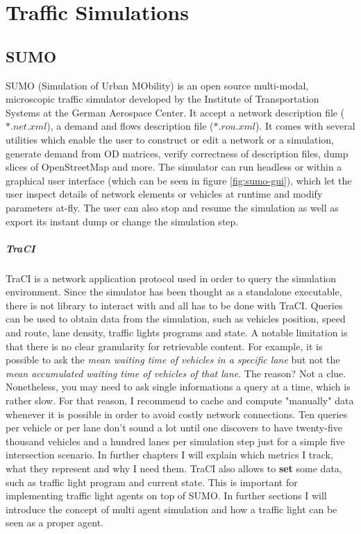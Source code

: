\chapter{Traffic Simulations}

\section{SUMO}

SUMO (Simulation of Urban MObility) is an open source multi-modal, microscopic traffic simulator developed by the Institute of Transportation Systems at the German Aerospace Center. It accept a network description file ($*.net.xml$), a demand and flows description file ($*.rou.xml$). It comes with several utilities which enable the user to construct or edit a network or a simulation, generate demand from OD matrices, verify correctness of description files, dump slices of OpenStreetMap and more. The simulator can run headless or within a graphical user interface (which can be seen in figure \ref{fig:sumo-gui}), which let the user inspect details of network elements or vehicles at runtime and modify parameters at-fly. The user can also stop and resume the simulation as well as export its instant dump or change the simulation step.

\paragraph{TraCI}

TraCI is a network application protocol used in order to query the simulation environment. Since the simulator has been thought as a standalone executable, there is not library to interact with and all has to be done with TraCI. Queries can be used to obtain data from the simulation, such as vehicles position, speed and route, lane density, traffic lights programs and state. A notable limitation is that there is no clear granularity for retrievable content. For example, it is possible to ask the \textit{mean waiting time of vehicles in a specific lane} but not the \textit{mean accumulated waiting time of vehicles of that lane}. The reason? Not a clue. Nonetheless, you may need to ask single informations a query at a time, which is rather slow. For that reason, I recommend to cache and compute "manually" data whenever it is possible in order to avoid costly network connections. Ten queries per vehicle or per lane don't sound a lot until one discovers to have twenty-five thousand vehicles and a hundred lanes per simulation step just for a simple five intersection scenario. In further chapters I will explain which metrics I track, what they represent and why I need them. TraCI also allows to \textbf{set} some data, such as traffic light program and current state. This is important for implementing traffic light agents on top of SUMO. In further sections I will introduce the concept of multi agent simulation and how a traffic light can be seen as a proper agent.

